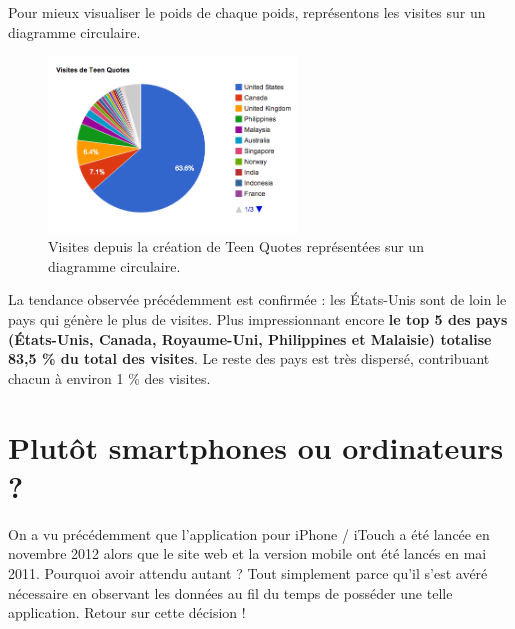 \documentclass{report}
\begin{document}
	\vspace{10px}
	Pour mieux visualiser le poids de chaque poids, représentons les visites sur un diagramme circulaire.
	\begin{figure}[H]
		\center
		\includegraphics[width=250px]{images/visitesMondialesCamembert.png}
		\caption{Visites depuis la création de Teen Quotes représentées sur un diagramme circulaire.}
	\end{figure}
	La tendance observée précédemment est confirmée : les États-Unis sont de loin le pays qui génère le plus de visites. Plus impressionnant encore \textbf{le top 5 des pays (États-Unis, Canada, Royaume-Uni, Philippines et Malaisie) totalise 83,5 \% du total des visites}. Le reste des pays est très dispersé, contribuant chacun à environ 1 \% des visites.
	\section{Plutôt smartphones ou ordinateurs ?}
	On a vu précédemment que l'application pour iPhone / iTouch a été lancée en novembre 2012 alors que le site web et la version mobile ont été lancés en mai 2011. Pourquoi avoir attendu autant ? Tout simplement parce qu'il s'est avéré nécessaire en observant les données au fil du temps de posséder une telle application. Retour sur cette décision !\\
\end{document}
